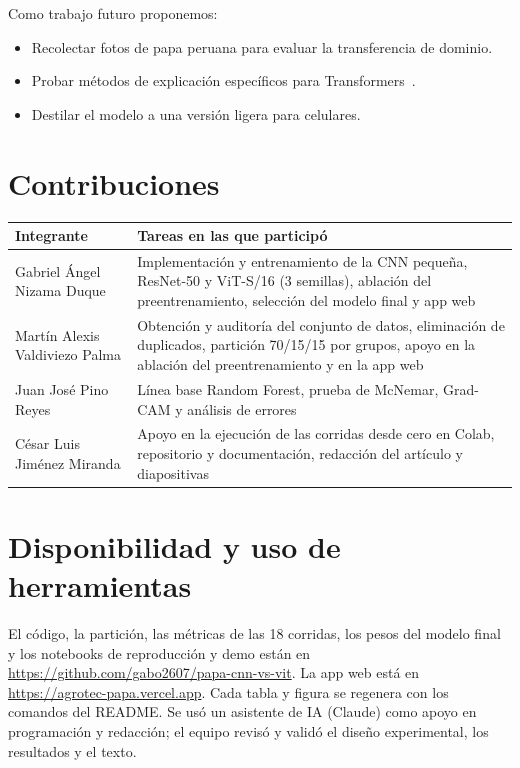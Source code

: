 \documentclass[conference,a4paper]{IEEEtran}
\begin{document}
Como trabajo futuro proponemos:
\begin{itemize}
\item Recolectar fotos de papa peruana para evaluar la transferencia de dominio.
\item Probar métodos de explicación específicos para Transformers~\cite{chefer2021transformer}.
\item Destilar el modelo a una versión ligera para celulares.
\end{itemize}

\section*{Contribuciones}
\begin{center}\small
\begin{tabular}{>{\raggedright\arraybackslash}p{}>{\raggedright\arraybackslash}p{}}
\toprule
Integrante & Tareas en las que participó \\
\midrule
Gabriel Ángel Nizama Duque & Implementación y entrenamiento de la CNN pequeña, ResNet-50 y ViT-S/16 (3 semillas), ablación del preentrenamiento, selección del modelo final y app web \\
Martín Alexis Valdiviezo Palma & Obtención y auditoría del conjunto de datos, eliminación de duplicados, partición 70/15/15 por grupos, apoyo en la ablación del preentrenamiento y en la app web \\
Juan José Pino Reyes & Línea base Random Forest, prueba de McNemar, Grad-CAM y análisis de errores \\
César Luis Jiménez Miranda & Apoyo en la ejecución de las corridas desde cero en Colab, repositorio y documentación, redacción del artículo y diapositivas \\
\bottomrule
\end{tabular}
\end{center}

\section*{Disponibilidad y uso de herramientas}
El código, la partición, las métricas de las 18 corridas, los pesos del modelo final y los notebooks de reproducción y demo están en \url{https://github.com/gabo2607/papa-cnn-vs-vit}. La app web está en \url{https://agrotec-papa.vercel.app}. Cada tabla y figura se regenera con los comandos del README. Se usó un asistente de IA (Claude) como apoyo en programación y redacción; el equipo revisó y validó el diseño experimental, los resultados y el texto.



\end{document}
